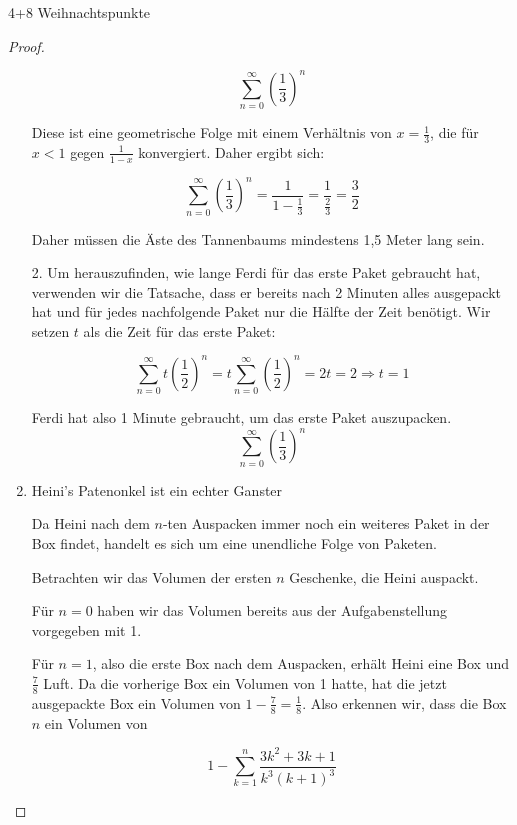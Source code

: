 \documentclass{problemset}
\begin{document}
\begin{problem}[Weihnachtsaufgaben*]{4+8 Weihnachtspunkte}
\begin{proof}
\begin{enumerate}
              \[
                  \sum_{n=0}^{\infty} {\left(\frac{1}{3}\right)}^n
              \]

              Diese ist eine geometrische Folge mit einem Verhältnis von \(x =
              \frac{1}{3}\), die für \(x < 1\) gegen \(\frac{1}{1 - x}\)
              konvergiert. Daher ergibt sich:

              \[
                  \sum_{n=0}^{\infty} {\left(\frac{1}{3}\right)}^n = \frac{1}{1 - \frac{1}{3}} = \frac{1}{\frac{2}{3}} = \frac{3}{2}
              \]

              Daher müssen die Äste des Tannenbaums mindestens 1,5 Meter lang
              sein.

              2. Um herauszufinden, wie lange Ferdi für das erste Paket gebraucht hat, verwenden wir die Tatsache, dass er bereits nach 2 Minuten alles ausgepackt hat und für jedes nachfolgende Paket nur die Hälfte der Zeit benötigt.
              Wir setzen $t$ als die Zeit für das erste Paket:

              \[
                  \sum_{n=0}^{\infty} t {\left(\frac{1}{2}\right)}^n = t \sum_{n=0}^{\infty} {\left(\frac{1}{2}\right)}^n = 2t = 2 \Rightarrow t = 1
              \]

              Ferdi hat also 1 Minute gebraucht, um das erste Paket
              auszupacken.
              \[
                  \sum_{n=0}^{\infty} {\left(\frac{1}{3}\right)}^n
              \]

        \item Heini's Patenonkel ist ein echter Ganster

              Da Heini nach dem $n$-ten Auspacken immer noch ein weiteres Paket
              in der Box findet, handelt es sich um eine unendliche Folge von
              Paketen.

              Betrachten wir das Volumen der ersten $n$ Geschenke, die Heini
              auspackt.

              Für $n = 0$ haben wir das Volumen bereits aus der
              Aufgabenstellung vorgegeben mit 1.

              Für $n = 1$, also die erste Box nach dem Auspacken, erhält Heini
              eine Box und $\frac{7}{8}$ Luft. Da die vorherige Box ein Volumen
              von 1 hatte, hat die jetzt ausgepackte Box ein Volumen von $1 -
              \frac{7}{8} = \frac{1}{8}$. Also erkennen wir, dass die Box $n$
              ein Volumen von

              \[
                  1 - \sum_{k=1}^n \frac{3k^2 + 3k + 1}{k^3{(k+1)}^3}
              \]


\end{enumerate}
\end{proof}
\end{problem}
\end{document}
